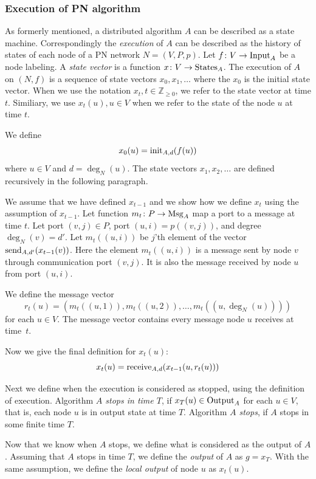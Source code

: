 \subsubsection{Execution of PN algorithm}

As formerly mentioned, a distributed algorithm $A$ can be described as a state machine.
Correspondingly the \emph{execution} of $A$ can be described as the history of states of each node of a PN network $N=(V, P, p)$.
Let $f\colon V \rightarrow \operatorname{Input}_A$ be a node labeling.
A \emph{state vector} is a function $x\colon V \rightarrow \operatorname{States}_A$.
The execution of $A$ on $(N, f)$ is a sequence of state vectors $x_0, x_1, \dotsc$ where the $x_0$ is the initial state vector.
When we use the notation $x_t, t \in \mathbb{Z}_{\geq 0}$, we refer to the state vector at time $t$.
Similiary, we use $x_t(u), u \in V$ when we refer to the state of the node $u$ at time $t$.

We define $$x_0(u) = \operatorname{init}_{A,d}(f(u))$$ where $u\in V$ and $d=\deg_N(u)$.
The state vectors $x_1, x_2, \dotsc$ are defined recursively in the following paragraph.

We assume that we have defined $x_{t-1}$ and we show how we define $x_{t}$ using the assumption of $x_{t-1}$.
Let function $m_t\colon P \rightarrow \operatorname{Msg}_A$ map a port to a message at time $t$.
Let port $(v, j) \in P$, port $(u, i) = p((v, j))$, and degree $\deg_N(v) = d'$.
Let $m_t((u, i))$ be $j$'th element of the vector $\operatorname{send}_{A, d'}(x_{t-1}(v))$.
Here the element $m_t((u, i))$ is a message sent by node $v$ through communication port $(v, j)$.
It is also the message received by node $u$ from port $(u, i)$.

We define the message vector $$r_t(u)=(m_t((u, 1)), m_t((u, 2)), \dotsc, m_t((u, \deg_N(u))))$$ for each $u\in V$.
The message vector contains every message node $u$ receives at time~$t$.

Now we give the final definition for $x_t(u)$:
$$x_t(u) = \operatorname{receive}_{A,d}(x_{t-1}(u, r_t(u)))$$

Next we define when the execution is considered as stopped, using the definition of execution.
Algorithm \emph{$A$ stops in time $T$}, if $x_T(u) \in \operatorname{Output}_A$ for each $u \in V$, that is, each node $u$ is in output state at time $T$.
Algorithm \emph{$A$ stops}, if $A$ stops in some finite time $T$.


Now that we know when $A$ stops, we define what is considered as the output of $A$.
Assuming that $A$ stops in time $T$, we define the \emph{output} of $A$ as $g=x_T$.
With the same assumption, we define the \emph{local output} of node $u$ as $x_t(u)$.



